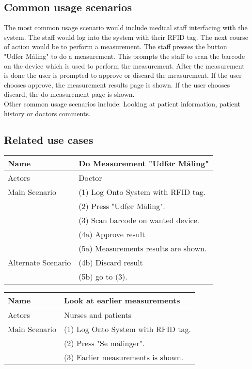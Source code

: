 \subsection{Common usage scenarios}
The most common usage scenario would include medical staff interfacing with the system. The staff would log into the system with their RFID tag. The next course of action would be to perform a measurement. The staff presses the button "Udfør Måling" to do a measurement. This prompts the staff to scan the barcode on the  device which is used to perform the measurement. After the measurement is done the user is prompted to approve or discard the measurement. If the user chooses approve, the measurement results page is shown. If the user chooses discard, the do measurement page is shown.\\
Other common usage scenarios include: Looking at patient information, patient history or doctors comments.

\subsection{Related use cases}

\begin{table}[H]
    \begin{tabular}{|p{4cm}|p{8cm}|}
    \hline
    Name          & Do Measurement "Udfør Måling"   \\\hline
    Actors        & Doctor \\\hline
    Main Scenario & (1) Log Onto System with RFID tag. \\
    ~             & (2) Press "Udfør Måling". \\
    ~             & (3) Scan barcode on wanted device. \\
    ~             & (4a) Approve result \\         
    ~             & (5a) Measurements results are shown.\\\hline
    
    Alternate Scenario & (4b) Discard result \\
        ~             & (5b) go to (3).\\\hline
    \end{tabular}
\end{table}

\begin{table}[H]
    \begin{tabular}{|p{4cm}|p{8cm}|}
    \hline
    Name          & Look at earlier measurements   \\\hline
    Actors        & Nurses and patients \\\hline
    Main Scenario & (1) Log Onto System with RFID tag. \\
    ~             & (2) Press "Se målinger". \\  
    ~             & (3) Earlier measurements is shown.\\\hline
    \end{tabular}
\end{table}

